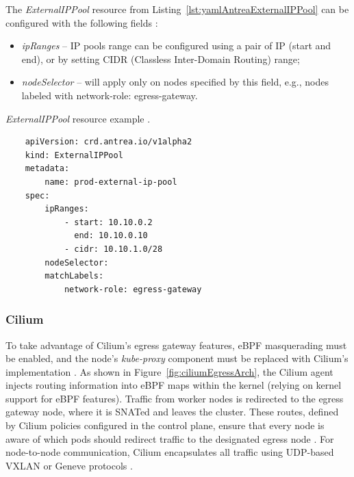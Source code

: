 The \textit{ExternalIPPool} resource from Listing~\ref{lst:yamlAntreaExternalIPPool} can be configured with the following fields \cite{AntreaDocs}:

\begin{itemize}
    \item \textit{ipRanges} -- IP pools range can be configured using a pair of IP (start and end), or by setting CIDR (Classless Inter-Domain Routing) range;
    \item \textit{nodeSelector} -- will apply only on nodes specified by this field, e.g., nodes labeled with network-role: egress-gateway.
\end{itemize}

\begin{listing}[htb]
    \centering
    \caption{\textit{ExternalIPPool} resource example \cite{AntreaDocs}.}
    \begin{verbatim}
    apiVersion: crd.antrea.io/v1alpha2
    kind: ExternalIPPool
    metadata:
        name: prod-external-ip-pool
    spec:
        ipRanges:
            - start: 10.10.0.2
              end: 10.10.0.10
            - cidr: 10.10.1.0/28
        nodeSelector:
        matchLabels:
            network-role: egress-gateway
    \end{verbatim}
    \label{lst:yamlAntreaExternalIPPool}
\end{listing}
  


\subsubsection{Cilium}
\label{subsection:ciliumEgress}

To take advantage of Cilium's egress gateway features, eBPF masquerading must be enabled, and the node's \textit{kube-proxy} component must be replaced with Cilium's implementation \cite{CiliumDocs}. As shown in Figure~\ref{fig:ciliumEgressArch}, the Cilium agent injects routing information into eBPF maps within the kernel (relying on kernel support for eBPF features). Traffic from worker nodes is redirected to the egress gateway node, where it is SNATed and leaves the cluster. These routes, defined by Cilium policies configured in the control plane, ensure that every node is aware of which pods should redirect traffic to the designated egress node \cite{CiliumDocs}. For node-to-node communication, Cilium encapsulates all traffic using UDP-based VXLAN or Geneve protocols \cite{CiliumDocs}.

